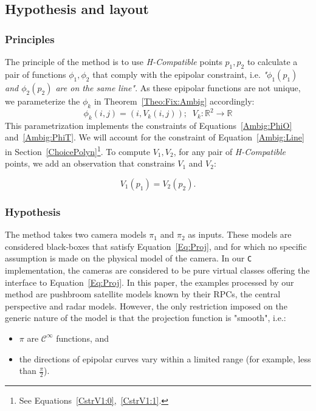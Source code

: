 \documentclass{ipol}
\newcommand{\CPP}{\mbox{\tt C\hspace{-0.05cm}\raisebox{0.2ex}{\small ++} }}
\newcommand{\RR}{\ensuremath{\mathbb{R}}}
\begin{document}
\subsection{Hypothesis and layout}

\subsubsection{Principles}
The principle of the method is to use \emph{H-Compatible}  points $p_1,p_2$ to calculate a
pair of functions $\phi_1,\phi_2$ that comply with the epipolar constraint, i.e. 
\emph{"$\phi_1(p_1)$ and $\phi_2(p_2)$ are on the same line"}. As these epipolar functions
are not unique, we parameterize the $\phi_k$ in Theorem~\ref{Theo:Fix:Ambig} accordingly:
%
\begin{equation}
    \phi_k(i,j) = (i,V_k(i,j)); \; \;
    V_k : \RR^2 \rightarrow \RR  
  \label{EpipVParam}
\end{equation}
%
This parametrization implements the constraints of Equations~\eqref{Ambig:PhiO} and~\eqref{Ambig:PhiT}. We will account for the constraint of  Equation~\eqref{Ambig:Line} in Section~\ref{ChoicePolyn}\footnote{See Equations~\eqref{CstrV1:0},~\eqref{CstrV1:1}.}. 
To compute $V_1,V_2$, for any pair of \emph{H-Compatible} points, we add an observation that constrains $V_1$ and $V_2$:


\begin{equation}
    V_1(p_1) = V_2(p_2) \label{EqV1V2}.
\end{equation}

\subsubsection{Hypothesis}


The method takes two camera models $\pi_1$ and $\pi_2$ as inputs.
These models are considered black-boxes that satisfy Equation~\eqref{Eq:Proj}, and for which no specific assumption is made on the physical model of the camera. In our \CPP implementation,
the cameras are considered to be pure virtual classes offering the interface to Equation~\eqref{Eq:Proj}.
In this paper, the examples processed by our method are pushbroom satellite models known by their RPCs, the central perspective and radar models. However, the only restriction imposed on the generic nature of the model is that the projection function is "smooth", i.e.:

\begin{itemize}
    \item $\pi$ are $\mathcal{C}^{\infty}$ functions, and
    \item the directions of epipolar curves vary within a limited range (for example,
          less than $\frac{\pi}{2}$).
\end{itemize}
\end{document}
